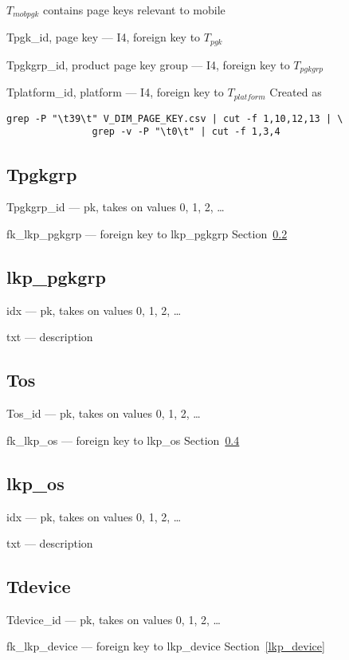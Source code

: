 \(T_{mobpgk}\) contains page keys relevant to mobile
\be
\item Tpgk\_id, page key --- I4, foreign key to \(T_{pgk}\)
\item Tpgkgrp\_id, product page key group --- I4, foreign key to \(T_{pgkgrp}\)
\item Tplatform\_id, platform --- I4, foreign key to \(T_{platform}\)
\ee
Created as
\begin{verbatim}
grep -P "\t39\t" V_DIM_PAGE_KEY.csv | cut -f 1,10,12,13 | \
               grep -v -P "\t0\t" | cut -f 1,3,4 
\end{verbatim}

\subsection{Tpgkgrp}
\label{Tpgkgrp}
\be
\item Tpgkgrp\_id --- pk, takes on values 0, 1, 2, \ldots
\item fk\_lkp\_pgkgrp --- foreign key to lkp\_pgkgrp
Section~\ref{lkp_pgkgrp}
\ee

\subsection{lkp\_pgkgrp}
\label{lkp_pgkgrp}
\be
\item idx --- pk, takes on values 0, 1, 2, \ldots
\item txt --- description
\ee
\subsection{Tos}
\label{Tos}
\be
\item Tos\_id --- pk, takes on values 0, 1, 2, \ldots
\item fk\_lkp\_os --- foreign key to lkp\_os
Section~\ref{lkp_os}
\ee

\subsection{lkp\_os}
\label{lkp_os}
\be
\item idx --- pk, takes on values 0, 1, 2, \ldots
\item txt --- description
\ee
\subsection{Tdevice}
\label{Tdevice}
\be
\item Tdevice\_id --- pk, takes on values 0, 1, 2, \ldots
\item fk\_lkp\_device --- foreign key to lkp\_device
Section~\ref{lkp_device}
\ee

